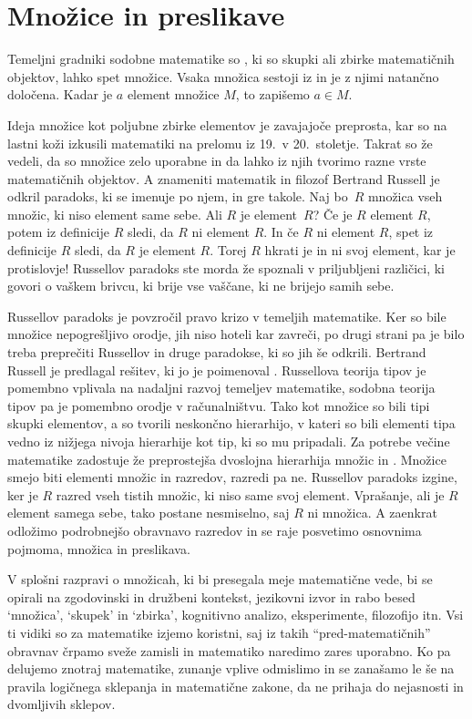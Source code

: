 \chapter{Množice in preslikave}
\label{cha:mnozice-in-preslikave}


Temeljni gradniki sodobne matematike so , ki so skupki ali zbirke matematičnih
objektov, lahko spet množice. Vsaka množica sestoji iz  in je z njimi
natančno določena. Kadar je $a$ element množice $M$, to zapišemo $a \in M$.

Ideja množice kot poljubne zbirke elementov je zavajajoče preprosta, kar so na lastni koži
izkusili matematiki na prelomu iz 19.~v 20.~stoletje. Takrat so že vedeli, da so množice zelo
uporabne in da lahko iz njih tvorimo razne vrste matematičnih objektov. A znameniti
matematik in filozof Bertrand Russell je odkril paradoks, ki se imenuje po njem, in gre
takole. Naj bo~$R$ množica vseh množic, ki niso element same sebe. Ali $R$ je element~$R$?
Če je $R$ element $R$, potem iz definicije $R$ sledi, da $R$ ni element $R$. In če $R$ ni
element $R$, spet iz definicije $R$ sledi, da $R$ je element $R$. Torej $R$ hkrati je in
ni svoj element, kar je protislovje! Russellov paradoks ste morda že spoznali v
priljubljeni različici, ki govori o vaškem brivcu, ki brije vse vaščane, ki ne brijejo
samih sebe.

Russellov paradoks je povzročil pravo krizo v temeljih matematike. Ker so bile množice
nepogrešljivo orodje, jih niso hoteli kar zavreči, po drugi strani pa je bilo treba
preprečiti Russellov in druge paradokse, ki so jih še odkrili. Bertrand Russell je
predlagal rešitev, ki jo je poimenoval . Russellova teorija tipov je
pomembno vplivala na nadaljni razvoj temeljev matematike, sodobna teorija tipov pa je
pomembno orodje v računalništvu. Tako kot množice so bili tipi skupki elementov, a so
tvorili neskončno hierarhijo, v kateri so bili elementi tipa vedno iz nižjega nivoja
hierarhije kot tip, ki so mu pripadali. Za potrebe večine matematike zadostuje že
preprostejša dvoslojna hierarhija množic in . Množice smejo biti elementi
množic in razredov, razredi pa ne. Russellov paradoks izgine, ker je $R$ razred vseh
tistih množic, ki niso same svoj element. Vprašanje, ali je $R$ element samega sebe, tako
postane nesmiselno, saj $R$ ni množica. A zaenkrat odložimo podrobnejšo obravnavo razredov
in se raje posvetimo osnovnima pojmoma, množica in preslikava.

V splošni razpravi o množicah, ki bi presegala meje matematične vede, bi se opirali na
zgodovinski in družbeni kontekst, jezikovni izvor in rabo besed `množica', `skupek' in
`zbirka', kognitivno analizo, eksperimente, filozofijo itn. Vsi ti vidiki so za matematike
izjemo koristni, saj iz takih ``pred-matematičnih'' obravnav črpamo sveže zamisli in
matematiko naredimo zares uporabno. Ko pa delujemo znotraj matematike, zunanje vplive
odmislimo in se zanašamo le še na pravila logičnega sklepanja in matematične zakone, da ne
prihaja do nejasnosti in dvomljivih sklepov.

